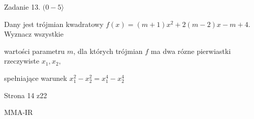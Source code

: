 \documentclass[a4paper,12pt]{article}
\begin{document}
Zadanie 13. $(0-5\rangle$

Dany jest trójmian kwadratowy $f(x)=(m+1)x^{2}+2(m-2)x-m+4$. Wyznacz wszystkie

wartości parametru $m$, dla których trójmian $f$ ma dwa rózne pierwiastki rzeczywiste $x_{1}, x_{2},$

spełniające warunek $x_{1}^{2}-x_{2}^{2}=x_{1}^{4}-x_{2}^{4}$

Strona 14 z22

MMA-IR
\end{document}
